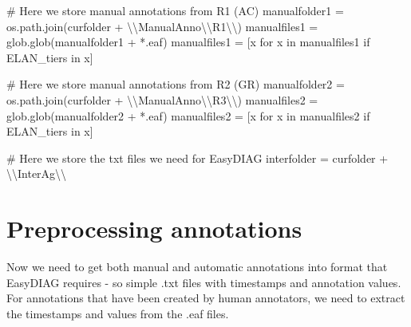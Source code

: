 \documentclass[
  letterpaper,
  DIV=11,
  numbers=noendperiod]{scrreprt}
\newenvironment{Shaded}{\begin{snugshade}}{\end{snugshade}}
\newcommand{\CharTok}[1]{\textcolor[rgb]{0.13,0.47,0.30}{#1}}
\newcommand{\CommentTok}[1]{\textcolor[rgb]{0.37,0.37,0.37}{#1}}
\newcommand{\ControlFlowTok}[1]{\textcolor[rgb]{0.00,0.23,0.31}{#1}}
\newcommand{\KeywordTok}[1]{\textcolor[rgb]{0.00,0.23,0.31}{#1}}
\newcommand{\NormalTok}[1]{\textcolor[rgb]{0.00,0.23,0.31}{#1}}
\newcommand{\OperatorTok}[1]{\textcolor[rgb]{0.37,0.37,0.37}{#1}}
\newcommand{\StringTok}[1]{\textcolor[rgb]{0.13,0.47,0.30}{#1}}
\begin{document}
\begin{Shaded}
\begin{Highlighting}[]
\CommentTok{\# Here we store manual annotations from R1 (AC)}
\NormalTok{manualfolder1 }\OperatorTok{=}\NormalTok{ os.path.join(curfolder }\OperatorTok{+} \StringTok{\textquotesingle{}}\CharTok{\textbackslash{}\textbackslash{}}\StringTok{ManualAnno}\CharTok{\textbackslash{}\textbackslash{}}\StringTok{R1}\CharTok{\textbackslash{}\textbackslash{}}\StringTok{\textquotesingle{}}\NormalTok{)}
\NormalTok{manualfiles1 }\OperatorTok{=}\NormalTok{ glob.glob(manualfolder1 }\OperatorTok{+} \StringTok{\textquotesingle{}*.eaf\textquotesingle{}}\NormalTok{)}
\NormalTok{manualfiles1 }\OperatorTok{=}\NormalTok{ [x }\ControlFlowTok{for}\NormalTok{ x }\KeywordTok{in}\NormalTok{ manualfiles1 }\ControlFlowTok{if} \StringTok{\textquotesingle{}ELAN\_tiers\textquotesingle{}} \KeywordTok{in}\NormalTok{ x]}

\CommentTok{\# Here we store manual annotations from R2 (GR)}
\NormalTok{manualfolder2 }\OperatorTok{=}\NormalTok{ os.path.join(curfolder }\OperatorTok{+} \StringTok{\textquotesingle{}}\CharTok{\textbackslash{}\textbackslash{}}\StringTok{ManualAnno}\CharTok{\textbackslash{}\textbackslash{}}\StringTok{R3}\CharTok{\textbackslash{}\textbackslash{}}\StringTok{\textquotesingle{}}\NormalTok{)}
\NormalTok{manualfiles2 }\OperatorTok{=}\NormalTok{ glob.glob(manualfolder2 }\OperatorTok{+} \StringTok{\textquotesingle{}*.eaf\textquotesingle{}}\NormalTok{)}
\NormalTok{manualfiles2 }\OperatorTok{=}\NormalTok{ [x }\ControlFlowTok{for}\NormalTok{ x }\KeywordTok{in}\NormalTok{ manualfiles2 }\ControlFlowTok{if} \StringTok{\textquotesingle{}ELAN\_tiers\textquotesingle{}} \KeywordTok{in}\NormalTok{ x]}

\CommentTok{\# Here we store the txt files we need for EasyDIAG}
\NormalTok{interfolder }\OperatorTok{=}\NormalTok{ curfolder }\OperatorTok{+} \StringTok{\textquotesingle{}}\CharTok{\textbackslash{}\textbackslash{}}\StringTok{InterAg}\CharTok{\textbackslash{}\textbackslash{}}\StringTok{\textquotesingle{}}
\end{Highlighting}
\end{Shaded}


\chapter{Preprocessing annotations}\label{preprocessing-annotations}

Now we need to get both manual and automatic annotations into format
that EasyDIAG requires - so simple .txt files with timestamps and
annotation values. For annotations that have been created by human
annotators, we need to extract the timestamps and values from the .eaf
files.
\end{document}
